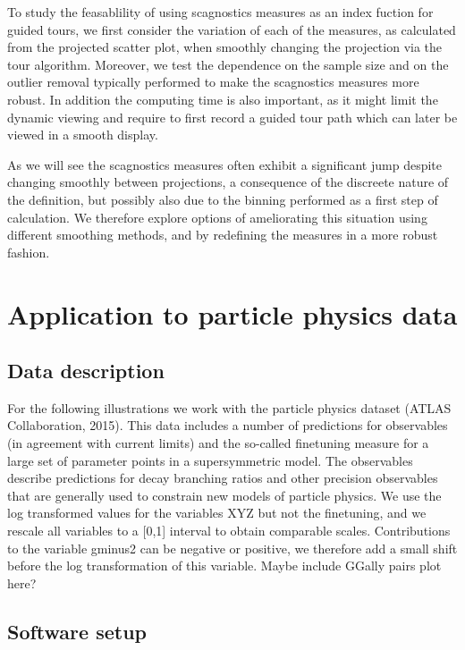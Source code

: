 \documentclass[article]{jss}
\begin{document}
To study the feasablility of using scagnostics measures as an index
fuction for guided tours, we first consider the variation of each of the
measures, as calculated from the projected scatter plot, when smoothly
changing the projection via the tour algorithm. Moreover, we test the
dependence on the sample size and on the outlier removal typically
performed to make the scagnostics measures more robust. In addition the
computing time is also important, as it might limit the dynamic viewing
and require to first record a guided tour path which can later be viewed
in a smooth display.

As we will see the scagnostics measures often exhibit a significant jump
despite changing smoothly between projections, a consequence of the
discreete nature of the definition, but possibly also due to the binning
performed as a first step of calculation. We therefore explore options
of ameliorating this situation using different smoothing methods, and by
redefining the measures in a more robust fashion.

\section{Application to particle physics
data}\label{application-to-particle-physics-data}

\subsection{Data description}\label{data-description}

For the following illustrations we work with the particle physics
dataset (ATLAS Collaboration, 2015). This data includes a number of
predictions for observables (in agreement with current limits) and the
so-called finetuning measure for a large set of parameter points in a
supersymmetric model. The observables describe predictions for decay
branching ratios and other precision observables that are generally used
to constrain new models of particle physics. We use the log transformed
values for the variables XYZ but not the finetuning, and we rescale all
variables to a {[}0,1{]} interval to obtain comparable scales.
Contributions to the variable gminus2 can be negative or positive, we
therefore add a small shift before the log transformation of this
variable. Maybe include GGally pairs plot here?

\subsection{Software setup}\label{software-setup}
\end{document}
